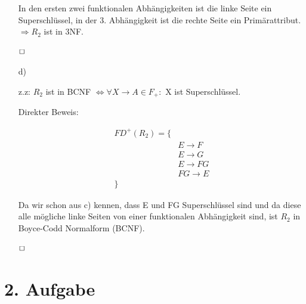 \begin{enumerate}
In den ersten zwei funktionalen Abhängigkeiten ist die linke Seite ein Superschlüssel, in der 3. Abhängigkeit ist die rechte Seite ein Primärattribut.
$\Rightarrow R_2$ ist in 3NF.

$\hfill \Box$

\item[d)]

z.z: $R_2$ ist in BCNF $\Leftrightarrow \forall X \rightarrow A \in F_{+}:$ X ist Superschlüssel.

Direkter Beweis: 

\begin{align*}
    FD^{+}(R_2) = \{ & \\
    & E \rightarrow F \\
    & E \rightarrow G \\
    & E \rightarrow FG \\
    & FG \rightarrow E \\
    \} &
\end{align*}

Da wir schon aus c) kennen, dass E und FG Superschlüssel sind und da diese alle mögliche linke Seiten von einer funktionalen Abhängigkeit sind, ist $R_2$ in Boyce-Codd Normalform (BCNF).

$\hfill \Box$

\end{enumerate}

\section*{2. Aufgabe}

